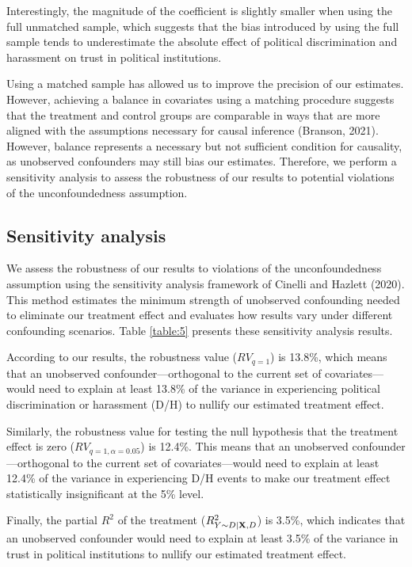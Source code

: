 \documentclass{article}
\begin{document}
Interestingly, the magnitude of the coefficient is slightly smaller when using the full unmatched sample, which suggests that the bias introduced by using the full sample tends to underestimate the absolute effect of political discrimination and harassment on trust in political institutions.

Using a matched sample has allowed us to improve the precision of our estimates. However, achieving a balance in covariates using a matching procedure suggests that the treatment and control groups are comparable in ways that are more aligned with the assumptions necessary for causal inference (Branson, 2021). However, balance represents a necessary but not sufficient condition for causality, as unobserved confounders may still bias our estimates. Therefore, we perform a sensitivity analysis to assess the robustness of our results to potential violations of the unconfoundedness assumption.

\subsection{Sensitivity analysis}

We assess the robustness of our results to violations of the unconfoundedness assumption using the sensitivity analysis framework of Cinelli and Hazlett (2020). This method estimates the minimum strength of unobserved confounding needed to eliminate our treatment effect and evaluates how results vary under different confounding scenarios. Table \ref{table:5} presents these sensitivity analysis results.

According to our results, the robustness value ($RV_{q = 1}$) is 13.8\%, which means that an unobserved confounder—orthogonal to the current set of covariates—would need to explain at least 13.8\% of the variance in experiencing political discrimination or harassment (D/H) to nullify our estimated treatment effect.

Similarly, the robustness value for testing the null hypothesis that the treatment effect is zero ($RV_{q = 1, \alpha = 0.05}$) is 12.4\%. This means that an unobserved confounder—orthogonal to the current set of covariates—would need to explain at least 12.4\% of the variance in experiencing D/H events to make our treatment effect statistically insignificant at the 5\% level.

Finally, the partial $R^2$ of the treatment ($R^2_{Y\sim D| {\bf X}, D}$) is 3.5\%, which indicates that an unobserved confounder would need to explain at least 3.5\% of the variance in trust in political institutions to nullify our estimated treatment effect.
\end{document}
